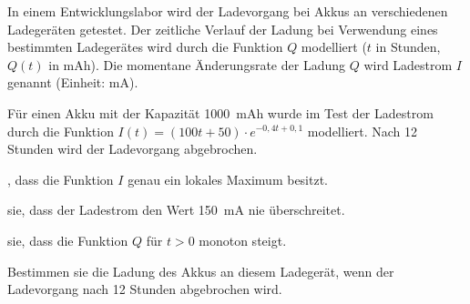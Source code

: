 \documentclass[11pt, a5paper, landscape, final]{scrartcl}
\begin{document}
	\begin{aufgabe}
		In einem Entwicklungslabor wird der Ladevorgang bei Akkus an verschiedenen Ladegeräten getestet. Der zeitliche Verlauf der Ladung bei Verwendung eines bestimmten Ladegerätes wird durch die Funktion $Q$ modelliert ($t$ in Stunden, $Q(t)$ in \si{mAh}). Die momentane Änderungsrate der Ladung $Q$ wird Ladestrom $I$ genannt (Einheit: \si{mA}).
		
		Für einen Akku mit der Kapazität \SI{1000}{mAh} wurde im Test der Ladestrom durch die Funktion $I(t) = (100t + 50)\cdot e^{-0,4t+0,1}$ modelliert. Nach 12 Stunden wird der Ladevorgang abgebrochen.
		
		\begin{enumeratea}
			\item {}, dass die Funktion $I$ genau ein lokales Maximum besitzt.
			
			\item {} sie, dass der Ladestrom den Wert \SI{150}{mA} nie überschreitet.
			
			\item {} sie, dass die Funktion $Q$ für $t>0$ monoton steigt.
			
			\item Bestimmen sie die Ladung des Akkus an diesem Ladegerät, wenn der Ladevorgang nach 12 Stunden abgebrochen wird.
		\end{enumeratea}
	\end{aufgabe}
	\clearpage
\end{document}
